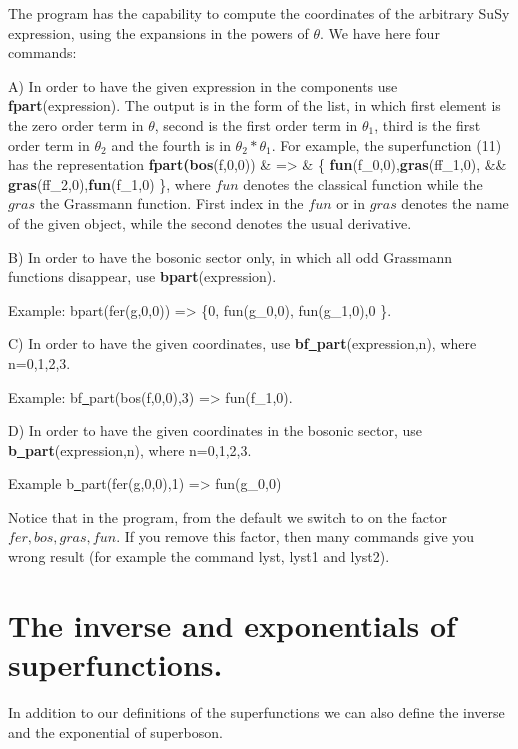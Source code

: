         The program has the capability to compute the coordinates of
the arbitrary SuSy expression, using the expansions in the powers of $\theta$.
We have here four commands:
\vspace{0.5cm}

A) In order to have the given expression in the components use
\be
        {\bf fpart}(expression).
\ee
The output is in the form of the list, in which first element is the zero
order term in $\theta$, second is the first order term in $\theta_{1}$,
third is the first order term in $\theta_{2}$ and the fourth is in
$\theta_{2}*\theta_{1}$. For example, the superfunction (11) has the
representation
\pe
  {\bf fpart(bos}(f,0,0)) & => & \{ {\bf fun}(f_{0},0),{\bf gras}(ff_{1},0), \cr
     &&   {\bf gras}(ff_{2},0),{\bf fun}(f_{1},0) \},
\ke
where $fun$ denotes the classical function while the $gras$ the Grassmann
function. First index in the $fun$ or in $gras$ denotes the name of the given
object, while the second denotes the usual derivative.
\vspace{0.2cm}

B) In order to have the bosonic sector only, in which all odd Grassmann
functions disappear,  use
\be
      {\bf bpart}(expression).
\ee

Example:
\be
      bpart(fer(g,0,0)) => \{0, fun(g_{0},0), fun(g_{1},0),0 \}.
\ee

C) In order to have the given coordinates, use
\be
        {\bf bf\underline{~}part}(expression,n),
\ee
where n=0,1,2,3.

Example:
\be
        bf\underline{~}part(bos(f,0,0),3) => fun(f_{1},0).
\ee

D) In order to have the given coordinates in the bosonic sector, use
\be
        {\bf b\underline{~}part}(expression,n),
\ee
where n=0,1,2,3.

Example
\be
        b\underline{~}part(fer(g,0,0),1) => fun(g_{0},0)
\ee


Notice that in the program,  from the default we switch to on the
factor $ fer,bos,gras,fun $. If you remove this factor, then many commands
give you wrong result (for example the command lyst, lyst1 and lyst2).

\section{The inverse and exponentials of superfunctions.}

        In addition to our definitions of the superfunctions we can also
define the inverse and the exponential of superboson.

